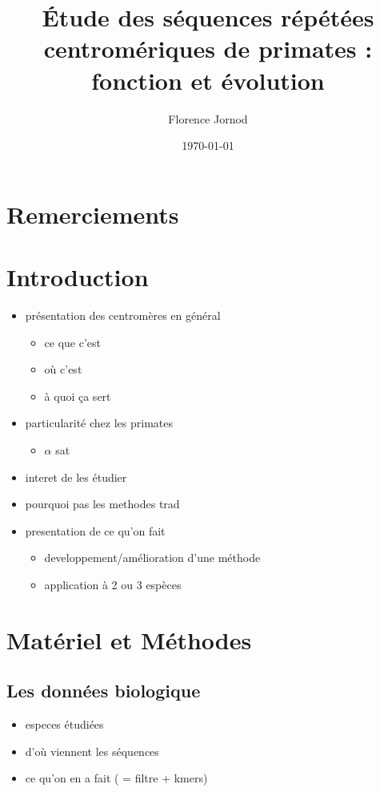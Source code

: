 \documentclass[a4paper,12pt]{article}
\title{Étude des séquences répétées centromériques de primates : fonction et évolution}
\author{Florence Jornod}
\date{\today}
\begin{document}
\maketitle
\thispagestyle{empty}
\newpage
\thispagestyle{empty}
\section*{Remerciements}
\newpage
\tableofcontents
\thispagestyle{empty}
\newpage
\setcounter{page}{1}
\section{Introduction}
\begin{itemize}
\item présentation des centromères en général
\begin{itemize}
\item ce que c'est
\item où c'est
\item à quoi ça sert
\end{itemize}
\item particularité chez les primates
\begin{itemize}
\item $\alpha$ sat 
\end{itemize}
\item interet de les étudier
\item pourquoi pas les methodes trad
\item presentation de ce qu'on fait
\begin{itemize}
\item developpement/amélioration d'une méthode 
\item application à 2 ou 3 espèces
\end{itemize}

\end{itemize}
\section{Matériel et Méthodes}
\subsection{Les données biologique} 
	\begin{itemize}
	\item especes étudiées
	\item d'où viennent les séquences
	\item ce qu'on en a fait ( = filtre + kmers)
	\end{itemize}
\end{document}
